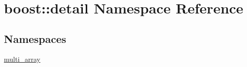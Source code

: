 \hypertarget{namespaceboost_1_1detail}{}\section{boost\+:\+:detail Namespace Reference}
\label{namespaceboost_1_1detail}
\subsection*{Namespaces}
\begin{DoxyCompactItemize}
\item 
 \mbox{\hyperlink{namespaceboost_1_1detail_1_1multi__array}{multi\+\_\+array}}
\end{DoxyCompactItemize}
